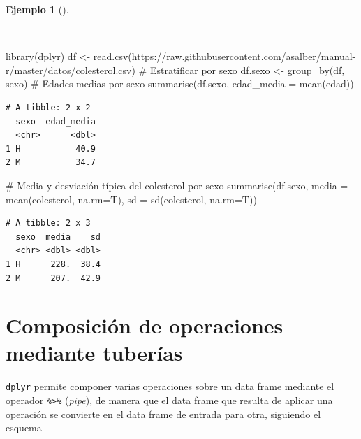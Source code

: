 \documentclass[
  spanish,
  a4paper,
]{scrreport}
\newenvironment{Shaded}{\begin{snugshade}}{\end{snugshade}}
\newcommand{\AttributeTok}[1]{\textcolor[rgb]{0.40,0.45,0.13}{#1}}
\newcommand{\CommentTok}[1]{\textcolor[rgb]{0.37,0.37,0.37}{#1}}
\newcommand{\FunctionTok}[1]{\textcolor[rgb]{0.28,0.35,0.67}{#1}}
\newcommand{\NormalTok}[1]{\textcolor[rgb]{0.00,0.23,0.31}{#1}}
\newcommand{\OtherTok}[1]{\textcolor[rgb]{0.00,0.23,0.31}{#1}}
\newcommand{\StringTok}[1]{\textcolor[rgb]{0.13,0.47,0.30}{#1}}
\theoremstyle{definition}
\theoremstyle{definition}
\newtheorem{example}{Ejemplo}[chapter]
\theoremstyle{remark}
\begin{document}
\begin{example}[]\protect\hypertarget{exm-group_by}{}\label{exm-group_by}

~

\begin{Shaded}
\begin{Highlighting}[]
\FunctionTok{library}\NormalTok{(dplyr)}
\NormalTok{df }\OtherTok{\textless{}{-}} \FunctionTok{read.csv}\NormalTok{(}\StringTok{\textquotesingle{}https://raw.githubusercontent.com/asalber/manual{-}r/master/datos/colesterol.csv\textquotesingle{}}\NormalTok{)}
\CommentTok{\# Estratificar por sexo }
\NormalTok{df.sexo }\OtherTok{\textless{}{-}} \FunctionTok{group\_by}\NormalTok{(df, sexo)}
\CommentTok{\# Edades medias por sexo}
\FunctionTok{summarise}\NormalTok{(df.sexo, }\AttributeTok{edad\_media =} \FunctionTok{mean}\NormalTok{(edad))}
\end{Highlighting}
\end{Shaded}

\begin{verbatim}
# A tibble: 2 x 2
  sexo  edad_media
  <chr>      <dbl>
1 H           40.9
2 M           34.7
\end{verbatim}

\begin{Shaded}
\begin{Highlighting}[]
\CommentTok{\# Media y desviación típica del colesterol por sexo}
\FunctionTok{summarise}\NormalTok{(df.sexo, }\AttributeTok{media =} \FunctionTok{mean}\NormalTok{(colesterol, }\AttributeTok{na.rm=}\NormalTok{T), }\AttributeTok{sd =} \FunctionTok{sd}\NormalTok{(colesterol, }\AttributeTok{na.rm=}\NormalTok{T))}
\end{Highlighting}
\end{Shaded}

\begin{verbatim}
# A tibble: 2 x 3
  sexo  media    sd
  <chr> <dbl> <dbl>
1 H      228.  38.4
2 M      207.  42.9
\end{verbatim}

\end{example}

\section{Composición de operaciones mediante
tuberías}\label{composiciuxf3n-de-operaciones-mediante-tuberuxedas}

\texttt{dplyr} permite componer varias operaciones sobre un data frame
mediante el operador \texttt{\%\textgreater{}\%} (\emph{pipe}), de
manera que el data frame que resulta de aplicar una operación se
convierte en el data frame de entrada para otra, siguiendo el esquema
\end{document}
